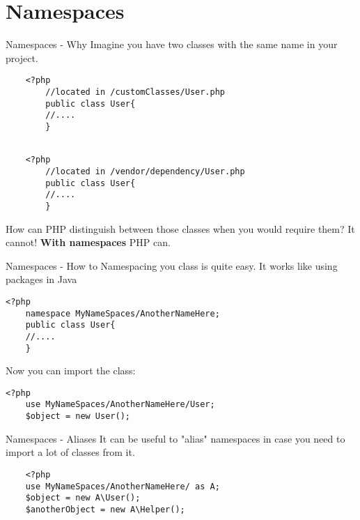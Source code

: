 \section{Namespaces}

\begin{frame}[fragile]{Namespaces - Why}
		Imagine you have two classes with the same name in your project. \pause
		\begin{lstlisting}
	<?php
		//located in /customClasses/User.php
		public class User{
		//....
		}
		\end{lstlisting} \pause
		\begin{lstlisting}
		
	<?php
		//located in /vendor/dependency/User.php
		public class User{
		//....
		}
		\end{lstlisting} \pause
		
		How can PHP distinguish between those classes when you would require them? \pause
		It cannot! \textbf{With namespaces} PHP can.
\end{frame}

\begin{frame}[fragile]{Namespaces - How to}
	Namespacing you class is quite easy. It works like using packages in Java \pause
	\begin{lstlisting}
<?php
	namespace MyNameSpaces/AnotherNameHere;
	public class User{
	//....
	}
	\end{lstlisting} \pause
	
	Now you can import the class:
	
	\begin{lstlisting}
<?php
	use MyNameSpaces/AnotherNameHere/User;
	$object = new User();
	\end{lstlisting}
	
\end{frame}

\begin{frame}[fragile]{Namespaces - Aliases}
	It can be useful to "alias" namespaces in case you need to import a lot of classes from it.
	
	\begin{lstlisting}
	<?php
	use MyNameSpaces/AnotherNameHere/ as A;
	$object = new A\User();	
	$anotherObject = new A\Helper();
	\end{lstlisting}
	
\end{frame}

